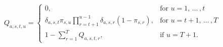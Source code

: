 \begin{equation}
  Q_{a, s, t, u} =
    \left\{
    \begin{array}{ll}
      0, 
      & 
      \text{for} \,\, u = 1, \, \ldots \, , t \\
      \delta_{a, s, t} 
      \pi_{s, u} 
      \prod_{r = t + 1}^{u - 1} 
        \delta_{a, s, r} \left(1 - \pi_{s, r} \right),
      & 
      \text{for} \,\, u = t + 1, \, \ldots \, , T \\
      1 - \sum_{r = 1}^{T} Q_{a, s, t, r},
      & 
      \text{if} \,\, u = T + 1.
    \end{array}\right.
  \label{eqn:multinomial-probabilities}
\end{equation}
  